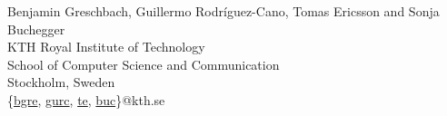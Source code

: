 


%


\def\thanks#1{\footnotemark
    \protected@xdef\@thanks{\@thanks
        \protect\footnotetext[\the\c@footnote]{#1}}%
}

\begin{center}
Benjamin Greschbach, Guillermo Rodr\'{i}guez-Cano, Tomas Ericsson and Sonja Buchegger\\[2em]

KTH Royal Institute of Technology\\
School of Computer Science and Communication\\
Stockholm, Sweden\\
\{\href{bgre@kth.se}{bgre}, \href{gurc@kth.se}{gurc}, \href{te@kth.se}{te}, \href{buc@kth.se}{buc}\}@kth.se

\end{center}

